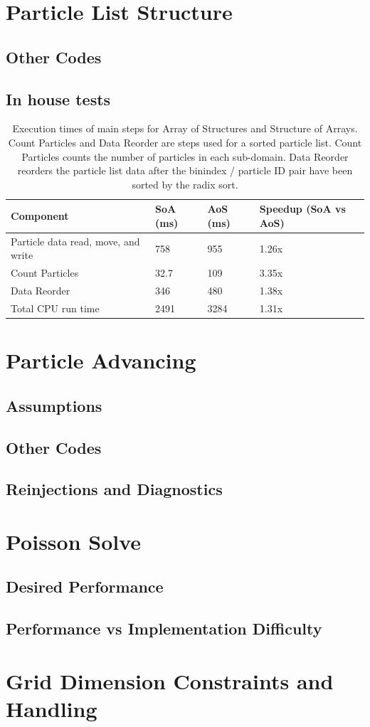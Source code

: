 	\section{Particle List Structure}
	
		\subsection{Other Codes}
		\subsection{In house tests}
\noindent \begin{table}[h]
\begin{tabular}{| p{4.0cm} | p{3.5cm} | p{2.5cm} | p{4.0cm} |}
\hline
Component & SoA (ms) & AoS (ms) & Speedup (SoA vs AoS) \\ \hline
Particle data read, move, and write & 758 & 955 & 1.26x \\ \hline
Count Particles & 32.7 & 109 & 3.35x \\ \hline
Data Reorder & 346 & 480 & 1.38x \\ \hline
Total CPU run time & 2491 & 3284 & 1.31x \\ \hline
\end{tabular}
\caption{Execution times of main steps for Array of Structures and Structure of Arrays. Count Particles and Data Reorder are steps used for a sorted particle list. Count Particles counts the number of particles in each sub-domain. Data Reorder reorders the particle list data after the binindex / particle ID pair have been sorted by the radix sort.}
\label{tab:struct_compare} 
\end{table}

	\section{Particle Advancing}
		\subsection{Assumptions}
		\subsection{Other Codes}
		\subsection{Reinjections and Diagnostics}

	\section{Poisson Solve}
		\subsection{Desired Performance}
		\subsection{Performance vs Implementation Difficulty}

	\section{Grid Dimension Constraints and Handling}
